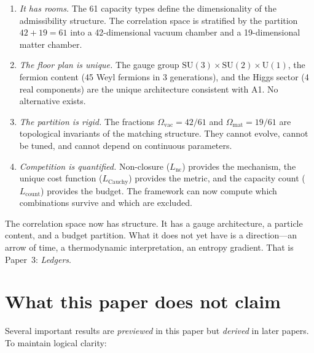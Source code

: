\documentclass[11pt]{article}
\newcommand{\SU}{\mathrm{SU}}
\newcommand{\U}{\mathrm{U}}
\begin{document}
\begin{enumerate}
\item \textit{It has rooms.}  The 61 capacity types define the dimensionality of the admissibility structure.  The correlation space is stratified by the partition $42 + 19 = 61$ into a 42-dimensional vacuum chamber and a 19-dimensional matter chamber.

\item \textit{The floor plan is unique.}  The gauge group $\SU(3) \times \SU(2) \times \U(1)$, the fermion content (45 Weyl fermions in 3 generations), and the Higgs sector (4 real components) are the unique architecture consistent with A1.  No alternative exists.

\item \textit{The partition is rigid.}  The fractions $\Omega_{\mathrm{vac}} = 42/61$ and $\Omega_{\mathrm{mat}} = 19/61$ are topological invariants of the matching structure.  They cannot evolve, cannot be tuned, and cannot depend on continuous parameters.

\item \textit{Competition is quantified.}  Non-closure ($L_{\mathrm{nc}}$) provides the mechanism, the unique cost function ($L_{\mathrm{Cauchy}}$) provides the metric, and the capacity count ($L_{\mathrm{count}}$) provides the budget.  The framework can now compute which combinations survive and which are excluded.
\end{enumerate}

The correlation space now has structure.  It has a gauge architecture, a particle content, and a budget partition.  What it does not yet have is a direction---an arrow of time, a thermodynamic interpretation, an entropy gradient.  That is Paper~3: \emph{Ledgers}.


\section{What this paper does not claim}
\label{sec:caveats}

Several important results are \emph{previewed} in this paper but \emph{derived} in later papers.  To maintain logical clarity:
\end{document}
